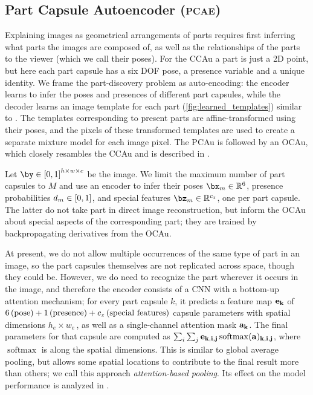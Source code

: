 \subsection{Part Capsule Autoencoder (\textsc{pcae})}
\label{sec:img_capsule}
Explaining images as geometrical arrangements of parts requires first inferring what parts the images are composed of, as well as the relationships of the parts to the viewer (which we call their poses). For the \gls{CCAu} a part is just a 2D point, but here each part capsule has a six \gls{DOF} pose, a presence variable and a unique identity. We frame the part-discovery problem as auto-encoding: the encoder learns to infer the poses and presences of different part capsules, while the decoder learns an image template for each part (\cref{fig:learned_templates}) similar to \cite{Tieleman2014thesis,Eslami2016}. The templates corresponding to present parts are affine-transformed using their poses, and the pixels of these transformed templates are used to create a separate mixture model for each image pixel.
The \gls{PCAu} is followed by an \gls{OCAu}, which closely resambles the \gls{CCAu} and is described in .

Let $\by \in \interval{0, 1}^{h \times w \times c}$ be the image.
We limit the maximum number of part capsules to $M$ and use an encoder to infer their poses $\bx_m \in \RR^6$, presence probabilities $d_m \in {\left[0, 1\right]}$, and special features $\bz_m \in \RR^{c_z}$, one per part capsule.
The latter do not take part in direct image reconstruction, but inform the \gls{OCAu} about special aspects of the corresponding part; they are trained by backpropagating derivatives from the \gls{OCAu}.

At present, we do not allow multiple occurrences of the same type of part in an image, so the part capsules themselves are not replicated across space, though they could be.
However, we do need to recognize the part wherever it occurs in the image, and therefore the encoder consists of a \gls{CNN} with a bottom-up attention mechanism; for every part capsule $k$, it predicts a feature map $\bf{e}_k$ of $6 \text{\,(pose)} + 1 \text{\,(presence)} + c_z \text{\,(special features)}$ capsule parameters with spatial dimensions $h_e \times w_e$\,, as well as a single-channel attention mask $\bf{a}_k$.
The final parameters for that capsule are computed as $\sum_{i} \sum_j \bf{e}_{k, i,j} \operatorname{softmax}(\bf{a})_{k,i,j}$, where $\operatorname{softmax}$ is along the spatial dimensions.
This is similar to global average pooling, but allows some spatial locations to contribute to the final result more than others; we call this approach \textit{attention-based pooling}. Its effect on the model performance is analyzed in .

